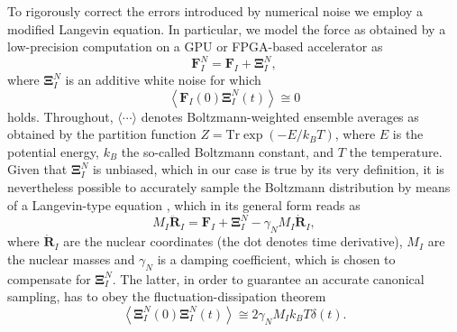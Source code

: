 \documentclass[format=acmsmall,review,timestamp,urlbreakonhyphens]{acmart}
\begin{document}
To rigorously correct the errors introduced by numerical noise we employ a modified Langevin equation. In particular, we model the force as obtained by a low-precision computation on a GPU or FPGA-based accelerator as
\begin{equation} \label{fFPGA}
\textbf{F}_{I}^{N} = \textbf{F}_{I} + \mathbf{\Xi }_{I}^{N},
\end{equation}
where $\mathbf{\Xi }_{I}^{N}$ is an additive white noise for which
\begin{equation} \label{CrossCorr}
 \left \langle \textbf{F}_{I}\left ( 0 \right ) \mathbf{\Xi } _{I}^{N}\left ( t \right )\right \rangle \cong  0
\end{equation}
holds. Throughout, $\langle \cdots \rangle$ denotes Boltzmann-weighted ensemble averages as obtained by the partition function $Z=\text{Tr} \exp(-E/k_B T)$, where $E$ is the potential energy, $k_B$ the so-called Boltzmann constant, and $T$ the temperature. Given that $\mathbf{\Xi }_{I}^{N}$ is unbiased, which in our case is true by its very definition, it is nevertheless possible to accurately sample the Boltzmann distribution by means of a Langevin-type equation \cite{Krajewski,Richters,Karhan}, which in its general form reads as
\begin{equation} \label{LangevinEq}
M_{I}\ddot{\textbf{R}}_{I}=\textbf{F}_{I}+\mathbf{\Xi }_{I}^{N}-\gamma _{N}M_{I}\dot{\textbf{R}}_{I},
\end{equation}
where $\dot{\textbf{R}}_{I}$ are the nuclear coordinates (the dot denotes time derivative), $M_I$ are the nuclear masses and $\gamma _{N}$ is a damping coefficient,
which is chosen to compensate for \(\mathbf{\Xi }_{I}^{N}\). The latter, in order to guarantee an accurate canonical sampling, has to obey
the fluctuation-dissipation theorem
\begin{equation}
\left \langle \mathbf{\Xi }_{I}^{N}\left ( 0 \right ) \mathbf{\Xi }_{I}^{N}\left ( t \right ) \right \rangle \cong  2 \gamma_{N} M_I k_{B} T  \delta \left ( t \right ).
\label{FDT}
\end{equation}
\end{document}
